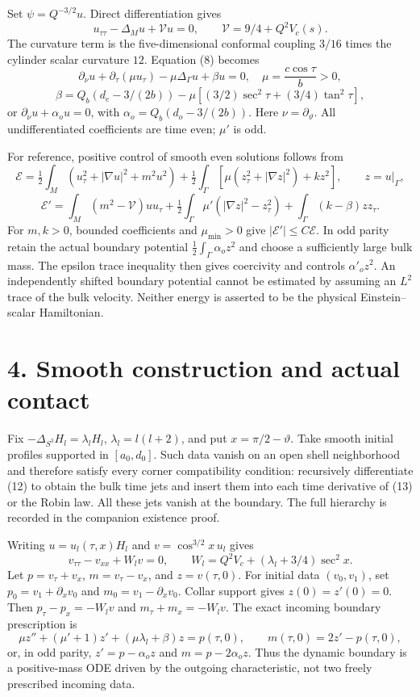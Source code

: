 \documentclass[
  10pt,
]{article}
\begin{document}
Set \(\psi=Q^{-3/2}u\). Direct differentiation gives \[
 u_{\tau\tau}-\Delta_Mu+\mathcal V u=0,
 \qquad\mathcal V=9/4+Q^2V_c(s).                         \tag{12}
\] The curvature term is the five-dimensional conformal coupling
\(3/16\) times the cylinder scalar curvature \(12\). Equation (8)
becomes \[
 \partial_\nu u+\partial_\tau(\mu u_\tau)
       -\mu\Delta_\Gamma u+\beta u=0,
 \quad\mu=\frac{c\cos\tau}{b}>0,
\] \[
 \beta=Q_b(d_e-3/(2b))
       -\mu[(3/2)\sec^2\tau+(3/4)\tan^2\tau],             \tag{13}
\] or \(\partial_\nu u+\alpha_o u=0\), with
\(\alpha_o=Q_b(d_o-3/(2b))\). Here \(\nu=\partial_\vartheta\). All
undifferentiated coefficients are time even; \(\mu'\) is odd.

For reference, positive control of smooth even solutions follows from \[
 \mathcal E=\tfrac12\int_M(u_\tau^2+|\nabla u|^2+m^2u^2)
  +\tfrac12\int_\Gamma[\mu(z_\tau^2+|\nabla z|^2)+kz^2],
 \qquad z=u|_\Gamma,
\] \[
 \mathcal E'=\int_M(m^2-\mathcal V)uu_\tau
  +\tfrac12\int_\Gamma\mu'(|\nabla z|^2-z_\tau^2)
  +\int_\Gamma(k-\beta)zz_\tau.                           \tag{14}
\] For \(m,k>0\), bounded coefficients and \(\mu_{\min}>0\) give
\(|\mathcal E'|\le C\mathcal E\). In odd parity retain the actual
boundary potential \(\frac12\int_\Gamma\alpha_o z^2\) and choose a
sufficiently large bulk mass. The epsilon trace inequality then gives
coercivity and controls \(\alpha'_o z^2\). An independently shifted
boundary potential cannot be estimated by assuming an \(L^2\) trace of
the bulk velocity. Neither energy is asserted to be the physical
Einstein--scalar Hamiltonian.

\section{4. Smooth construction and actual
contact}\label{smooth-construction-and-actual-contact}

Fix \(-\Delta_{S^3}H_l=\lambda_l H_l\), \(\lambda_l=l(l+2)\), and put
\(x=\pi/2-\vartheta\). Take smooth initial profiles supported in
\([a_0,d_0]\). Such data vanish on an open shell neighborhood and
therefore satisfy every corner compatibility condition: recursively
differentiate (12) to obtain the bulk time jets and insert them into
each time derivative of (13) or the Robin law. All these jets vanish at
the boundary. The full hierarchy is recorded in the companion existence
proof.

Writing \(u=u_l(\tau,x)H_l\) and \(v=\cos^{3/2}x\,u_l\) gives \[
 v_{\tau\tau}-v_{xx}+W_l v=0,
 \qquad W_l=Q^2V_c+(\lambda_l+3/4)\sec^2x.                \tag{15}
\] Let \(p=v_\tau+v_x\), \(m=v_\tau-v_x\), and \(z=v(\tau,0)\). For
initial data \((v_0,v_1)\), set \(p_0=v_1+\partial_xv_0\) and
\(m_0=v_1-\partial_xv_0\). Collar support gives \(z(0)=z'(0)=0\). Then
\(p_\tau-p_x=-W_lv\) and \(m_\tau+m_x=-W_lv\). The exact incoming
boundary prescription is \[
 \mu z''+(\mu'+1)z'+(\mu\lambda_l+\beta)z=p(\tau,0),
 \qquad m(\tau,0)=2z'-p(\tau,0),                         \tag{16}
\] or, in odd parity, \(z'=p-\alpha_o z\) and \(m=p-2\alpha_o z\). Thus
the dynamic boundary is a positive-mass ODE driven by the outgoing
characteristic, not two freely prescribed incoming data.
\end{document}
